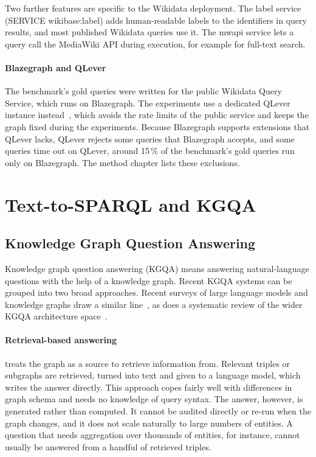 Two further features are specific to the Wikidata deployment.
The label service (SERVICE wikibase:label) adds human-readable labels to the identifiers in query results, and most published Wikidata queries use it.
The mwapi service lets a query call the MediaWiki API during execution, for example for full-text search.

\paragraph{Blazegraph and QLever}

The benchmark's gold queries were written for the public Wikidata Query Service, which runs on Blazegraph.
The experiments use a dedicated QLever instance instead~\citep{bast2017qlever}, which avoids the rate limits of the public service and keeps the graph fixed during the experiments.
Because Blazegraph supports extensions that QLever lacks, QLever rejects some queries that Blazegraph accepts, and some queries time out on QLever, around 15\,\% of the benchmark's gold queries run only on Blazegraph.
The method chapter lists these exclusions.

\section{Text-to-SPARQL and KGQA}

\subsection{Knowledge Graph Question
Answering}

\label{sec:kgqa}

Knowledge graph question answering (KGQA) means answering natural-language questions with the help of a knowledge graph.
Recent KGQA systems can be grouped into two broad approaches.
Recent surveys of large language models and knowledge graphs draw a similar line~\citep{ma2025llmkg}, as does a systematic review of the wider KGQA architecture space~\citep{perevalov2024survey}.

\paragraph{Retrieval-based
answering} treats the graph as a source to retrieve information from.
Relevant triples or subgraphs are retrieved, turned into text and given to a language model, which writes the answer directly.
This approach copes fairly well with differences in graph schema and needs no knowledge of query syntax.
The answer, however, is generated rather than computed.
It cannot be audited directly or re-run when the graph changes, and it does not scale naturally to large numbers of entities.
A question that needs aggregation over thousands of entities, for instance, cannot usually be answered from a handful of retrieved triples.

